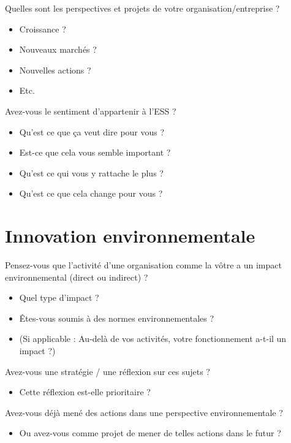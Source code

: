 Quelles sont les perspectives et projets de votre organisation/entreprise ? 
    \begin{itemize}
        \item Croissance ? 
        \item Nouveaux marchés ? 
        \item Nouvelles actions ?
        \item Etc. \\
    \end{itemize}
	
Avez-vous le sentiment d’appartenir à l’ESS ? 
    \begin{itemize}
        \item Qu’est ce que ça veut dire pour vous ? 
        \item Est-ce que cela vous semble important ? 
        \item Qu’est ce qui vous y rattache le plus ? 
        \item Qu’est ce que cela change pour vous ? \\
    \end{itemize}

\section*{Innovation environnementale}
Pensez-vous que l’activité d’une organisation comme la vôtre a un impact environnemental (direct ou indirect) ?
    \begin{itemize}
        \item Quel type d’impact ? 
        \item Êtes-vous soumis à des normes environnementales ? 
        \item (Si applicable : Au-delà de vos activités, votre fonctionnement a-t-il un impact ?) \\
    \end{itemize}

Avez-vous une stratégie / une réflexion sur ces sujets ?  
    \begin{itemize}
        \item Cette réflexion est-elle prioritaire ? \\
    \end{itemize}
	

Avez-vous déjà mené des actions dans une perspective environnementale ? 
    \begin{itemize}
        \item Ou avez-vous comme projet de mener de telles actions dans le futur ?  \\
    \end{itemize}
	

